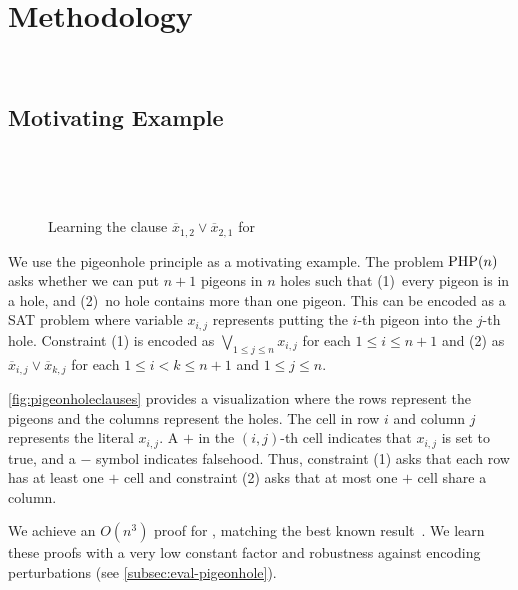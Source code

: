 \section{Methodology}~\label{sec:method}

\subsection{Motivating Example}~\label{sec:motivatex}

\begin{figure*}[!t]
    \centering
    
    \caption{Learning the clause $\overline{x}_{1, 2} \lor \overline{x}_{2, 1}$ for }~\label{fig:pigeonholeclauses}
  \end{figure*}

We use the pigeonhole principle as a motivating example.
The problem $\mathrm{PHP}(n)$ asks whether we can put $n+1$ pigeons in $n$ holes such
that (1)~every pigeon is in a hole, and (2)~no hole contains more than one
pigeon. This can be encoded as a SAT problem where variable $x_{i, j}$
represents putting the $i$-th pigeon into the $j$-th hole. Constraint (1)
is encoded as $\bigvee_{1 \leq j \leq n} x_{i, j}$ for each $1 \leq i \leq n+1$ and
(2) as $\overline{x}_{i, j} \lor \overline{x}_{k, j}$ for each $ 1
\leq i < k \leq n+1$ and $1 \leq j \leq n$.

\autoref{fig:pigeonholeclauses} provides a visualization where the
rows represent the pigeons and the columns represent the holes. The cell in row
$i$ and column $j$ represents the literal $x_{i, j}$.
A $+$ in the $(i, j)$-th cell indicates that $x_{i, j}$ is set to
true, and a $-$ symbol indicates falsehood.
Thus, constraint (1) asks that each row has at least one $+$ cell and
constraint (2) asks that at most one $+$ cell share a column.

We achieve an $O(n^3)$ \pr proof for , matching the best known
result~\cite{prclauses}. We learn these proofs with a very low constant
factor and robustness against encoding perturbations (see \autoref{subsec:eval-pigeonhole}).


